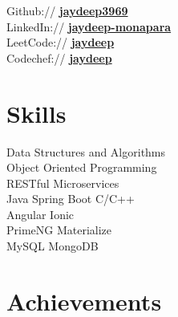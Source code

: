 \documentclass[]{jaydeep-resume-openfont}
\begin{document}
\begin{minipage}[t]{0.29\textwidth}
Github:// \href{https://github.com/jaydeep3969}{\bf jaydeep3969} \\
LinkedIn://  \href{https://in.linkedin.com/in/jaydeep-monapara-a70a48119}{\bf jaydeep-monapara} \\
LeetCode:// \href {https://leetcode.com/jaydeep_3969/}{\bf jaydeep} \\
Codechef:// \href {https://www.codechef.com/users/jaydeep_3969}{\bf jaydeep} \\
\sectionsep





\section{Skills}

\textbullet{} Data Structures and Algorithms \\
\textbullet{} Object Oriented Programming \\
\textbullet{} RESTful Microservices  \\
\textbullet{} Java Spring Boot \textbullet{} C/C++ \\
\textbullet{} Angular \textbullet{} Ionic \\
\textbullet{} PrimeNG \textbullet{} Materialize \\
\textbullet{} MySQL \textbullet{} MongoDB \\
\sectionsep


\section{Achievements}


\end{minipage}
\end{document}
